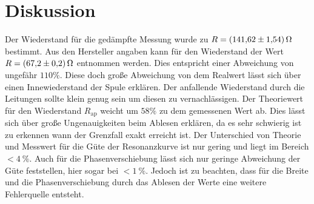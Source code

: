 \section{Diskussion}
\label{sec:Diskussion}
Der Wiederstand für die gedämpfte Messung wurde zu $R=\SI{141.62\pm1.54}{\ohm}$ bestimmt. Aus den Hersteller angaben kann für den Wiederstand der Wert $R=\SI{67.2\pm0.2}{\ohm}$ entnommen werden.
Dies entspricht einer Abweichung von ungefähr $110\%$. Diese doch große Abweichung von dem Realwert lässt sich über einen Innewiederstand der Spule erklären.
Der anfallende Wiederstand durch die Leitungen sollte klein genug sein um diesen zu vernachlässigen.
Der Theoriewert für den Wiederstand $R_\text{ap}$ weicht um $58\%$ zu dem gemessenen Wert ab. Dies lässt sich über große Ungenauigkeiten beim Ablesen erklären, da es sehr schwierig ist zu erkennen wann der Grenzfall exakt erreicht ist.
Der Unterschied von Theorie und Messwert für die Güte der Resonanzkurve ist nur gering und liegt im Bereich $<\SI{4}{\percent}$.
Auch für die Phasenverschiebung lässt sich nur geringe Abweichung der Güte feststellen, hier sogar bei $<\SI{1}{\percent}$.
Jedoch ist zu beachten, dass für die Breite und die Phasenverschiebung durch das Ablesen der Werte eine weitere Fehlerquelle entsteht. 
